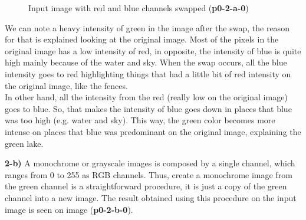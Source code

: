 \documentclass[12pt,a4paper]{article}
\begin{document}
\begin{figure}[!h]
	\centering
	{%
		\setlength{\fboxsep}{1pt}%
		\setlength{\fboxrule}{1pt}%
	}%
	\caption{Input image with red and blue channels swapped (\textbf{p0-2-a-0})}
	\label{fig:p0-2-a-0}
\end{figure}

We can note a heavy intensity of green in the image after the swap, the reason for that is explained looking at the original image. Most of the pixels in the original image has a low intensity of red, in opposite, the intensity of blue is quite high mainly because of the water and sky. When the swap occurs, all the blue intensity goes to red highlighting things that had a little bit of red intensity on the original image, like the fences. \\

In other hand, all the intensity from the red (really low on the original image) goes to blue. So, that makes the intensity of blue goes down in places that blue was too high (e.g. water and sky). This way, the green color becomes more intense on places that blue was predominant on the original image, explaining the green lake.\\

\newpage

\textbf{2-b) } A monochrome or grayscale images is composed by a single channel, which ranges from 0 to 255 as RGB channels. Thus, create a monochrome image from the green channel is a straightforward procedure, it is just a copy of the green channel into a new image. The result obtained using this procedure on the input image is seen on image (\textbf{p0-2-b-0}).
\end{document}
